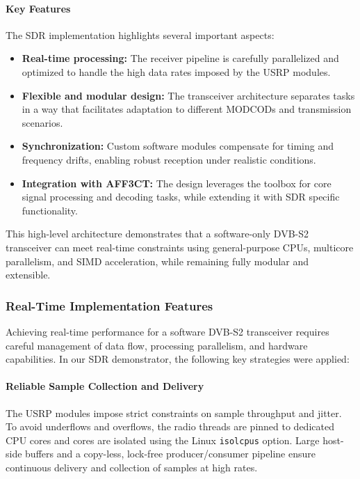 \documentclass[11pt]{report}
\newcommand{\AFFECT}{AFF3CT\xspace}
\begin{document}
\paragraph{Key Features}

The SDR implementation highlights several important aspects:

\begin{itemize}
  \item \textbf{Real-time processing:} The receiver pipeline is carefully
        parallelized and optimized to handle the high data rates imposed by the
        USRP modules.
  \item \textbf{Flexible and modular design:} The transceiver architecture
        separates tasks in a way that facilitates adaptation to different
        MODCODs and transmission scenarios.
  \item \textbf{Synchronization:} Custom software modules compensate for
        timing and frequency drifts, enabling robust reception under realistic
        conditions.
  \item \textbf{Integration with \AFFECT:} The design leverages the toolbox for
        core signal processing and decoding tasks, while extending it with SDR
        specific functionality.
\end{itemize}

This high-level architecture demonstrates that a software-only DVB-S2
transceiver can meet real-time constraints using general-purpose CPUs,
multicore parallelism, and SIMD acceleration, while remaining fully modular and
extensible.
\subsubsection{Real-Time Implementation Features}
\label{sec:real_time_summary}

Achieving real-time performance for a software DVB-S2 transceiver requires
careful management of data flow, processing parallelism, and hardware
capabilities. In our SDR demonstrator, the following key strategies were applied:

\paragraph{Reliable Sample Collection and Delivery}

The USRP modules impose strict constraints on sample throughput and jitter.
To avoid underflows and overflows, the radio threads are pinned to dedicated
CPU cores and cores are isolated using the Linux \texttt{isolcpus} option.
Large host-side buffers and a copy-less, lock-free producer/consumer pipeline
ensure continuous delivery and collection of samples at high rates.
\end{document}
